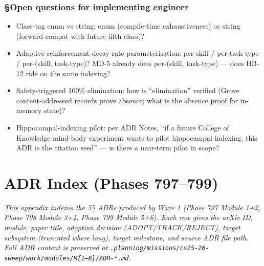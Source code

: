 \documentclass[11pt,letterpaper]{article}
\providecommand{\tightlist}{\setlength{\itemsep}{0pt}\setlength{\parskip}{0pt}}
\begin{document}
\subsubsection{§Open questions for implementing
engineer}

\begin{itemize}
\tightlist
\item
  Class-tag enum vs string: enum (compile-time exhaustiveness) or string
  (forward-compat with future fifth class)?
\item
  Adaptive-reinforcement decay-rate parameterisation: per-skill /
  per-task-type / per-(skill, task-type)? MD-5 already does per-(skill,
  task-type) --- does HB-12 ride on the same indexing?
\item
  Safety-triggered 100\% elimination: how is ``elimination'' verified
  (Grove content-addressed records prove absence; what is the absence
  proof for in-memory state)?
\item
  Hippocampal-indexing pilot: per ADR Notes, ``if a future College of
  Knowledge mind-body experiment wants to pilot hippocampal indexing,
  this ADR is the citation seed'' --- is there a near-term pilot in
  scope?
\end{itemize}


\clearpage

\section{ADR Index (Phases 797--799)}

\textit{This appendix indexes the 55 ADRs produced by Wave 1 (Phase 797 Module 1+2, Phase 798 Module 3+4, Phase 799 Module 5+6). Each row gives the arXiv ID, module, paper title, adoption decision (ADOPT/TRACK/REJECT), target subsystem (truncated where long), target milestone, and source ADR file path. Full ADR content is preserved at \texttt{.planning/missions/cs25-26-sweep/work/modules/M\{1--6\}/ADR-*.md}.}
\end{document}
